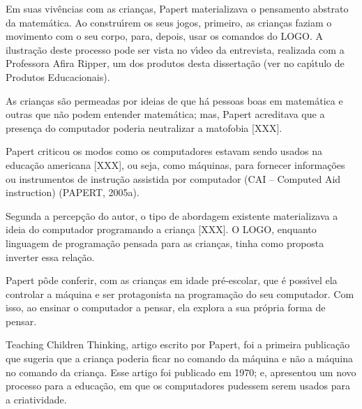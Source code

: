\documentclass[
12pt,		%
openright,	%
twoside,  %
a4paper,			%
chapter=TITLE,		%
english,			%
french,				%
spanish,			%
brazil				%
]{USPSC-classe/USPSC}
\begin{document}
Em suas viv\^encias com as crian\c{c}as, Papert materializava o pensamento abstrato da matem\'atica. Ao constru\'{\i}rem os seus jogos, primeiro, as crian\c{c}as faziam o movimento com o seu corpo, para, depois, usar os comandos do LOGO. A ilustra\c{c}\~ao deste processo pode ser vista no v\'{\i}deo  da entrevista, realizada com a Professora Afira Ripper,  um dos produtos desta disserta\c{c}\~ao (ver no cap\'{\i}tulo de Produtos Educacionais).










As crian\c{c}as s\~ao permeadas por ideias de que h\'a pessoas boas em matem\'atica e outras que n\~ao podem entender matem\'atica; mas, Papert acreditava que a presen\c{c}a do computador poderia neutralizar a matofobia [XXX].










Papert criticou os modos como os computadores estavam sendo usados na educa\c{c}\~ao americana [XXX], ou seja, como m\'aquinas, para fornecer informa\c{c}\~oes ou instrumentos de instru\c{c}\~ao assistida por computador (CAI – Computed Aid instruction)  (PAPERT, 2005a).










Segunda a percep\c{c}\~ao do autor, o tipo de abordagem existente materializava a ideia do computador programando a crian\c{c}a [XXX]. O LOGO, enquanto linguagem de programa\c{c}\~ao pensada para as crian\c{c}as, tinha como proposta inverter essa rela\c{c}\~ao.










Papert p\^ode conferir, com as crian\c{c}as em idade pr\'e-escolar, que \'e poss\'{\i}vel ela controlar a m\'aquina e ser protagonista na programa\c{c}\~ao do seu computador. Com isso, ao ensinar o computador a pensar, ela explora a sua pr\'opria forma de pensar.










Teaching Children Thinking, artigo escrito por Papert, foi a primeira publica\c{c}\~ao que sugeria que a crian\c{c}a poderia ficar no comando da m\'aquina e n\~ao a m\'aquina no comando da crian\c{c}a.  Esse artigo  foi publicado em 1970; e,  apresentou um novo processo para a educa\c{c}\~ao, em que os computadores pudessem serem usados para a criatividade.
\end{document}
